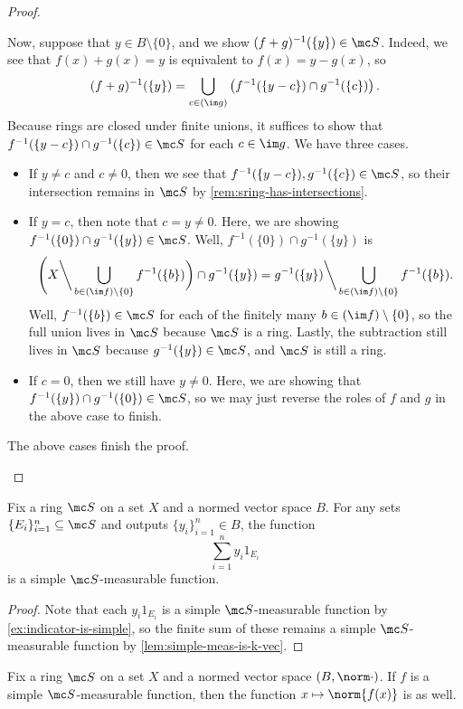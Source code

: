 \documentclass[../notes.tex]{subfiles}
\begin{document}
\begin{proof}
\begin{itemize}
		Now, suppose that $y\in B\setminus\{0\}$, and we show $(f+g)^{-1}(\{y\})\in\mc S$. Indeed, we see that $f(x)+g(x)=y$ is equivalent to $f(x)=y-g(x)$, so
		\[(f+g)^{-1}(\{y\})=\bigcup_{c\in(\im g)}\left(f^{-1}(\{y-c\})\cap g^{-1}(\{c\})\right).\]
		Because rings are closed under finite unions, it suffices to show that $f^{-1}(\{y-c\})\cap g^{-1}(\{c\})\in\mc S$ for each $c\in\im g$. We have three cases.
		\begin{itemize}
			\item If $y\ne c$ and $c\ne0$, then we see that $f^{-1}(\{y-c\}),g^{-1}(\{c\})\in\mc S$, so their intersection remains in $\mc S$ by \autoref{rem:sring-has-intersections}.
			\item If $y=c$, then note that $c=y\ne0$. Here, we are showing $f^{-1}(\{0\})\cap g^{-1}(\{y\})\in\mc S$. Well, $f^{-1}(\{0\})\cap g^{-1}(\{y\})$ is
			\[\Bigg(X{\mathbin\bigg\backslash}\bigcup_{b\in(\im f)\setminus\{0\}}f^{-1}(\{b\})\bigg)\cap g^{-1}(\{y\})=g^{-1}(\{y\}){\mathbin\bigg\backslash}\bigcup_{b\in(\im f)\setminus\{0\}}f^{-1}(\{b\}).\]
			Well, $f^{-1}(\{b\})\in\mc S$ for each of the finitely many $b\in(\im f)\setminus\{0\}$, so the full union lives in $\mc S$ because $\mc S$ is a ring. Lastly, the subtraction still lives in $\mc S$ because $g^{-1}(\{y\})\in\mc S$, and $\mc S$ is still a ring.
			\item If $c=0$, then we still have $y\ne0$. Here, we are showing that $f^{-1}(\{y\})\cap g^{-1}(\{0\})\in\mc S$, so we may just reverse the roles of $f$ and $g$ in the above case to finish.
		\end{itemize}
		The above cases finish the proof.
		\qedhere
	\end{itemize}
\end{proof}
\begin{corollary} \label{cor:indicator-sum-is-simp-meas}
	Fix a ring $\mc S$ on a set $X$ and a normed vector space $B$. For any sets $\{E_i\}_{i=1}^n\subseteq\mc S$ and outputs $\{y_i\}_{i=1}^n\in B$, the function
	\[\sum_{i=1}^ny_i1_{E_i}\]
	is a simple $\mc S$-measurable function.
\end{corollary}
\begin{proof}
	Note that each $y_i1_{E_i}$ is a simple $\mc S$-measurable function by \autoref{ex:indicator-is-simple}, so the finite sum of these remains a simple $\mc S$-measurable function by \autoref{lem:simple-meas-is-k-vec}.
\end{proof}
\begin{lemma} \label{lem:norm-is-simple-meas}
	Fix a ring $\mc S$ on a set $X$ and a normed vector space $(B,\norm\cdot)$. If $f$ is a simple $\mc S$-measurable function, then the function $x\mapsto\norm{f(x)}$ is as well.
\end{lemma}
\end{document}
